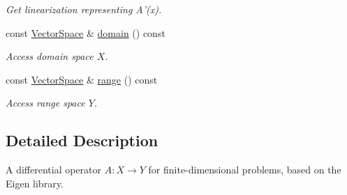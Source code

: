 \begin{DoxyCompactItemize}
\begin{DoxyCompactList}\small\item\em \-Get linearization representing \-A'(x). \end{DoxyCompactList}\item 
\hypertarget{classSpacy_1_1OperatorBase_a2588f9b3e0188820c4c494e63293dc6f}{const \hyperlink{classSpacy_1_1VectorSpace}{\-Vector\-Space} \& \hyperlink{classSpacy_1_1OperatorBase_a2588f9b3e0188820c4c494e63293dc6f}{domain} () const }\label{classSpacy_1_1OperatorBase_a2588f9b3e0188820c4c494e63293dc6f}

\begin{DoxyCompactList}\small\item\em \-Access domain space $X$. \end{DoxyCompactList}\item 
\hypertarget{classSpacy_1_1OperatorBase_ab19d3b7a6f290b1079248f1e567e53d6}{const \hyperlink{classSpacy_1_1VectorSpace}{\-Vector\-Space} \& \hyperlink{classSpacy_1_1OperatorBase_ab19d3b7a6f290b1079248f1e567e53d6}{range} () const }\label{classSpacy_1_1OperatorBase_ab19d3b7a6f290b1079248f1e567e53d6}

\begin{DoxyCompactList}\small\item\em \-Access range space $Y$. \end{DoxyCompactList}\end{DoxyCompactItemize}


\subsection{\-Detailed \-Description}
\-A differential operator $A:X\rightarrow Y$ for finite-\/dimensional problems, based on the \-Eigen library. 

